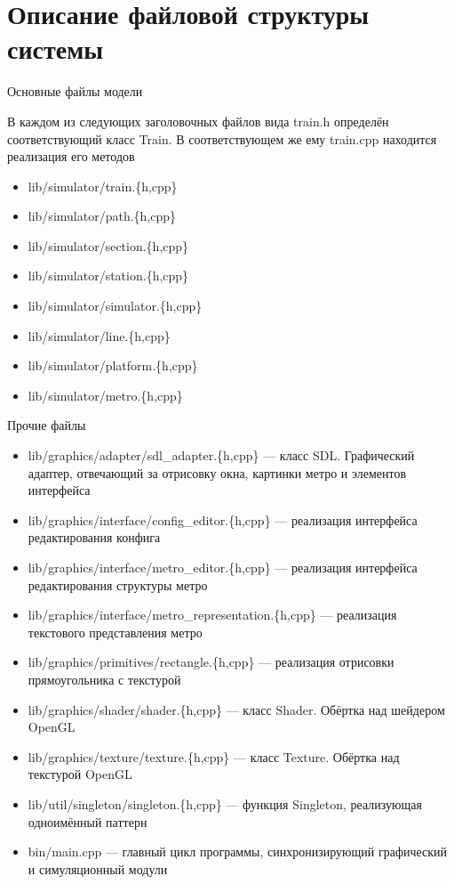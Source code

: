 \section{Описание файловой структуры системы}

Основные файлы модели

В каждом из следующих заголовочных файлов вида train.h определён соответствующий класс Train.
В соответствующем же ему train.cpp находится реализация его методов
\begin{itemize}
    \item lib/simulator/train.\{h,cpp\}
    \item lib/simulator/path.\{h,cpp\}
    \item lib/simulator/section.\{h,cpp\}
    \item lib/simulator/station.\{h,cpp\}
    \item lib/simulator/simulator.\{h,cpp\}
    \item lib/simulator/line.\{h,cpp\}
    \item lib/simulator/platform.\{h,cpp\}
    \item lib/simulator/metro.\{h,cpp\}
\end{itemize}

Прочие файлы
\begin{itemize}
    \item lib/graphics/adapter/sdl\_adapter.\{h,cpp\} --- класс SDL. Графический адаптер, отвечающий за отрисовку окна, картинки метро и элементов интерфейса
    \item lib/graphics/interface/config\_editor.\{h,cpp\} --- реализация интерфейса редактирования конфига
    \item lib/graphics/interface/metro\_editor.\{h,cpp\} --- реализация интерфейса редактирования структуры метро
    \item lib/graphics/interface/metro\_representation.\{h,cpp\} --- реализация текстового представления метро
    \item lib/graphics/primitives/rectangle.\{h,cpp\} --- реализация отрисовки прямоугольника с текстурой
    \item lib/graphics/shader/shader.\{h,cpp\} --- класс Shader. Обёртка над шейдером OpenGL
    \item lib/graphics/texture/texture.\{h,cpp\} --- класс Texture. Обёртка над текстурой OpenGL

    \item lib/util/singleton/singleton.\{h,cpp\} --- функция Singleton, реализующая одноимённый паттерн

    \item bin/main.cpp --- главный цикл программы, синхронизирующий графический и симуляционный модули
\end{itemize}
